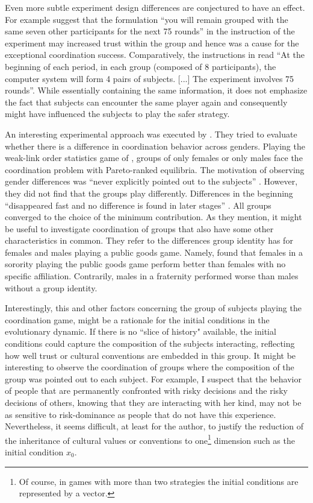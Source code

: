 Even more subtle experiment design differences are conjectured to have an
effect. For example \textcite{devetag_when_2007} suggest that the formulation
``you will remain grouped with the same seven other participants for the next
75 rounds'' in the instruction of the \textcite{rankin_strategic_2000}  
experiment may increased trust within the group and hence was a 
cause for the exceptional coordination success. Comparatively, the 
instructions in \textcite{dubois_optimization_2012} read ``At the beginning
of each period, in each group (composed of 8 participants), the computer
system will form 4 pairs of subjects. [...] The experiment 
involves 75 rounds''\parencite[378]{dubois_optimization_2012}. 
While essentially containing the same information,
it does not emphasize the fact that subjects can encounter the same 
player again and consequently might have influenced the subjects to play
the safer strategy.

An interesting experimental approach was executed by 
\textcite{dufwenberg_gender_2005}. They tried to evaluate whether 
there is a difference in coordination behavior across genders.
Playing the 
weak-link order statistics game of \textcite{van_huyck_tacit_1990}, groups of 
only females or only males face the coordination problem with Pareto-ranked 
equilibria. The motivation of observing gender differences was 
``never explicitly pointed  out to the subjects'' 
\parencite{dufwenberg_gender_2005}.
However, they did not find that the groups play
differently. Differences in the beginning ``disappeared fast and no difference
is found in later stages'' \parencite[235]{dufwenberg_gender_2005}. 
All groups converged to the choice of the minimum
contribution. As they mention, it might be useful to investigate 
coordination of groups that also have some other 
characteristics in common. They refer to the differences group 
identity has for females and males playing a 
public goods game. Namely, \textcite{croson_groups_2008} found that 
females in a sorority playing the public goods game perform better than 
females with no specific affiliation. Contrarily, males in a fraternity 
performed worse than males without a group identity. 

Interestingly, this and other factors concerning the group of subjects 
playing the coordination game, might be a rationale for the 
initial conditions in the evolutionary dynamic. If there is no 
``slice of history" available,
the initial conditions could capture the composition of the subjects 
interacting, reflecting how well trust or cultural conventions 
are embedded in this group.
It might be interesting to observe the 
coordination of groups where the composition of the group
was pointed out to each subject. 
For example, I suspect that the behavior of people that
are permanently confronted with risky decisions and the risky decisions
of others, knowing that they are interacting with her kind, 
may not be as sensitive to risk-dominance as people that do not
have this experience.
Nevertheless, it seems difficult, at least for the author, to justify
the reduction of the inheritance of cultural values or conventions to 
one\footnote{Of course, in games with more than two strategies 
the initial conditions are represented by a vector.} dimension such 
as the initial condition $x_0$. 
